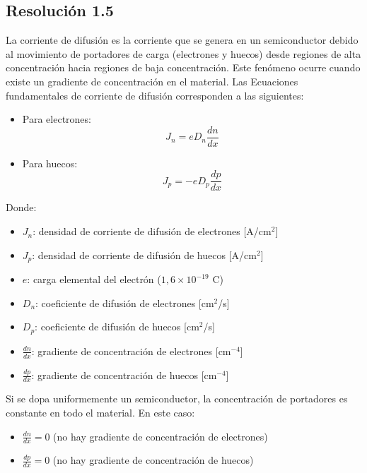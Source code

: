\documentclass[
  11pt,
  letterpaper,
   addpoints,
  ]{exam}
\begin{document}
\begin{questions}
\begin{solution}
\subsection*{Resolución 1.5}
La corriente de difusión es la corriente que se genera en un semiconductor debido al movimiento de portadores de carga (electrones y huecos) desde regiones de alta concentración hacia regiones de baja concentración. Este fenómeno ocurre cuando existe un gradiente de concentración en el material. Las Ecuaciones fundamentales de corriente de difusión corresponden a las siguientes:

\begin{itemize}
    \item Para electrones:
    \begin{equation}
        J_n = eD_n \frac{dn}{dx}
    \end{equation}
    \item Para huecos:
    \begin{equation}
        J_p = -eD_p \frac{dp}{dx}
    \end{equation}
\end{itemize}

Donde:
\begin{itemize}
    \item $J_n$: densidad de corriente de difusión de electrones [A/cm$^2$]
    \item $J_p$: densidad de corriente de difusión de huecos [A/cm$^2$]
    \item $e$: carga elemental del electrón ($1{,}6 \times 10^{-19}$ C)
    \item $D_n$: coeficiente de difusión de electrones [cm$^2$/s]
    \item $D_p$: coeficiente de difusión de huecos [cm$^2$/s]
    \item $\frac{dn}{dx}$: gradiente de concentración de electrones [cm$^{-4}$]
    \item $\frac{dp}{dx}$: gradiente de concentración de huecos [cm$^{-4}$]
\end{itemize}

Si se dopa uniformemente un semiconductor, la concentración de portadores es constante en todo el material. En este caso:
\begin{itemize}
    \item $\frac{dn}{dx} = 0$ (no hay gradiente de concentración de electrones)
    \item $\frac{dp}{dx} = 0$ (no hay gradiente de concentración de huecos)
\end{itemize}


\end{solution}
\end{questions}
\end{document}
